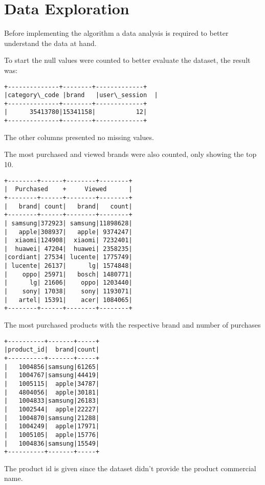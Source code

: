 \section{Data Exploration}
\label{data_exploration}

Before implementing the algorithm a data analysis is required to better understand the data at hand.

To start the null values were counted to better evaluate the dataset, the result was:
\begin{Verbatim}[commandchars=\\\{\}]
+--------------+--------+-------------+
|category\_code |brand   |user\_session  |
+--------------+--------+-------------+
|      35413780|15341158|           12|
+--------------+--------+-------------+
\end{Verbatim}
The other columns presented no missing values.


The most purchased and viewed brands were also counted, only showing the top 10.
\begin{Verbatim}[commandchars=\\\{\}]
+--------+------+--------+--------+    
|  Purchased    +     Viewed      |
+--------+------+--------+--------+
|   brand| count|   brand|   count|
+--------+------+--------+--------+
| samsung|372923| samsung|11898628|
|   apple|308937|   apple| 9374247|
|  xiaomi|124908|  xiaomi| 7232401|
|  huawei| 47204|  huawei| 2358235|
|cordiant| 27534| lucente| 1775749|
| lucente| 26137|      lg| 1574848|
|    oppo| 25971|   bosch| 1480771|
|      lg| 21606|    oppo| 1203440|
|    sony| 17038|    sony| 1193071|
|   artel| 15391|    acer| 1084065|
+--------+------+--------+--------+
\end{Verbatim}

The most purchased products with the respective brand and number of purchases
\begin{Verbatim}[commandchars=\\\{\}]
+----------+-------+-----+
|product_id|  brand|count|
+----------+-------+-----+
|   1004856|samsung|61265|
|   1004767|samsung|44419|
|   1005115|  apple|34787|
|   4804056|  apple|30181|
|   1004833|samsung|26183|
|   1002544|  apple|22227|
|   1004870|samsung|21288|
|   1004249|  apple|17971|
|   1005105|  apple|15776|
|   1004836|samsung|15549|
+----------+-------+-----+
\end{Verbatim}
The product id is given since the dataset didn't provide the product commercial name.

